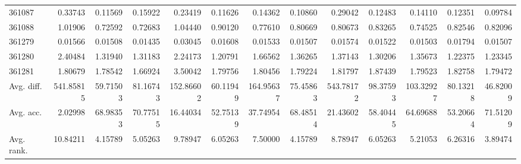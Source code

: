 \begin{tabular}{lrrrrrrrrrrrr}
361087 & 0.33743 & 0.11569 & 0.15922 & 0.23419 & 0.11626 & 0.14362 & 0.10860 & 0.29042 & 0.12483 & 0.14110 & 0.12351 & 0.09784 \\
361088 & 1.01906 & 0.72592 & 0.72683 & 1.04440 & 0.90120 & 0.77610 & 0.80669 & 0.80673 & 0.83265 & 0.74525 & 0.82546 & 0.82096 \\
361279 & 0.01566 & 0.01508 & 0.01435 & 0.03045 & 0.01608 & 0.01533 & 0.01507 & 0.01574 & 0.01522 & 0.01503 & 0.01794 & 0.01507 \\
361280 & 2.40484 & 1.31940 & 1.31183 & 2.24173 & 1.20791 & 1.66562 & 1.36265 & 1.37143 & 1.30206 & 1.35673 & 1.22375 & 1.23345 \\
361281 & 1.80679 & 1.78542 & 1.66924 & 3.50042 & 1.79756 & 1.80456 & 1.79224 & 1.81797 & 1.87439 & 1.79523 & 1.82758 & 1.79472 \\
Avg. diff. & 541.85815 & 59.71503 & 81.16743 & 152.86602 & 60.11949 & 164.95637 & 75.45863 & 543.78172 & 98.37593 & 103.32927 & 80.13218 & 46.82009 \\
Avg. acc. & 2.02998 & 68.98353 & 70.77515 & 16.44034 & 52.75139 & 37.74954 & 68.48514 & 21.43602 & 58.40445 & 64.69688 & 53.20664 & 71.51209 \\
Avg. rank. & 10.84211 & 4.15789 & 5.05263 & 9.78947 & 6.05263 & 7.50000 & 4.15789 & 8.78947 & 6.05263 & 5.21053 & 6.26316 & 3.89474 \\
\bottomrule
\end{tabular}
